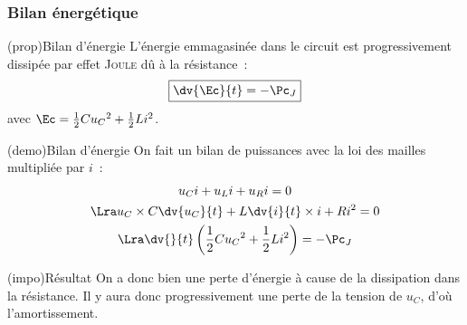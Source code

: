 \documentclass[../../main/main.tex]{subfiles}
\begin{document}
\vspace{-15pt}
\subsubsection{Bilan énergétique}
\begin{tcbraster}[raster columns=2, raster equal height=rows]
	\begin{tcb}[label=prop:lcenerg-décharge](prop){Bilan d'énergie}
		L'énergie emmagasinée dans le circuit est progressivement dissipée par
		effet \textsc{Joule} dû à la résistance~:
		\[\boxed{\dv{\Ec}{t} = -\Pc_J}\]
		avec $\Ec = \frac{1}{2}Cu_C{}^2 + \frac{1}{2}Li^2$.
	\end{tcb}
	\begin{tcb}[label=demo:rcenerg-charge](demo){Bilan d'énergie}
		On fait un bilan de puissances avec la loi des mailles multipliée par $i$~:
		\begin{gather*}
			u_Ci + u_Li + u_Ri= 0\\
			\Lra u_C\times C \dv{u_C}{t} + L \dv{i}{t}\times i + Ri^2 = 0\\
			\Lra \dv{}{t} \left( \frac{1}{2}Cu_C{}^2 +
			\frac{1}{2}Li^2 \right) = -\Pc_J
		\end{gather*}
	\end{tcb}
\end{tcbraster}
\begin{tcb}[label=impo:amortissement](impo){Résultat}
	On a donc bien une perte d'énergie à cause de la dissipation dans la
	résistance. Il y aura donc progressivement une perte de la tension
	de $u_C$, d'où l'amortissement.
\end{tcb}
\end{document}
